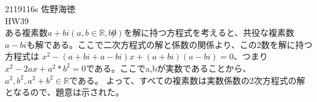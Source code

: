 \documentclass[11pt]{jsarticle}
\begin{document}
2119116s 佐野海徳\\
HW39\\
    ある複素数$a + bi (a,b \in \mathbb{R}, b \not 0)$を解に持つ方程式を考えると、共役な複素数$a - bi$も解である。ここで二次方程式の解と係数の関係より、この2数を解に持つ方程式は
$x^2 - (a + bi + a - bi)x + (a + bi)(a - bi) = 0$、つまり$x^2 - 2ax + a^2 * b^2 = 0$である。ここでa,bが実数であることから、$a^2, b^2, a^2 + b^2  \in \mathbb{R}$である。
    よって、すべての複素数は実数係数の2次方程式の解となるので、題意は示された。
\end{document}
